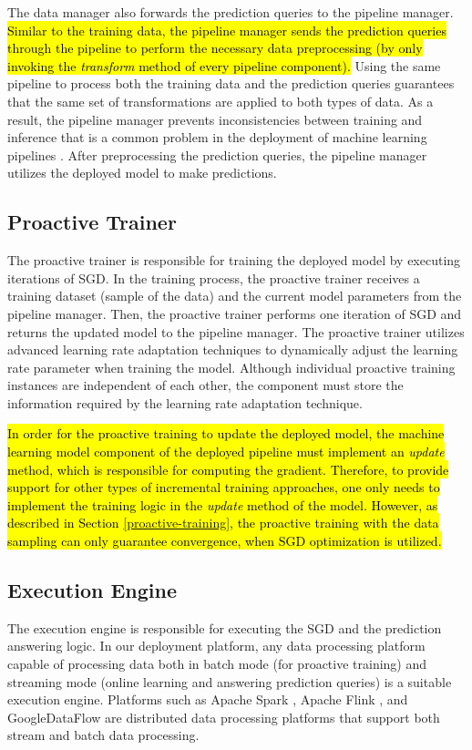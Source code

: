 The data manager also forwards the prediction queries to the pipeline manager.
\hl{Similar to the training data, the pipeline manager sends the prediction queries through the pipeline to perform the necessary data preprocessing (by only invoking the \textit{transform} method of every pipeline component).}
Using the same pipeline to process both the training data and the prediction queries guarantees that the same set of transformations are applied to both types of data.
As a result, the pipeline manager prevents inconsistencies between training and inference that is a common problem in the deployment of machine learning pipelines \cite{baylor2017tfx}.
After preprocessing the prediction queries, the pipeline manager utilizes the deployed model to make predictions.

\subsection{Proactive Trainer} 
The proactive trainer is responsible for training the deployed model by executing iterations of SGD.
In the training process, the proactive trainer receives a training dataset (sample of the data) and the current model parameters from the pipeline manager.
Then, the proactive trainer performs one iteration of SGD and returns the updated model to the pipeline manager.
The proactive trainer utilizes advanced learning rate adaptation techniques to dynamically adjust the learning rate parameter when training the model.
Although individual proactive training instances are independent of each other, the component must store the information required by the learning rate adaptation technique.

\hl{In order for the proactive training to update the deployed model, the machine learning model component of the deployed pipeline must implement an \textit{update} method, which is responsible for computing the gradient.
Therefore, to provide support for other types of incremental training approaches, one only needs to implement the training logic in the \textit{update} method of the model.
However, as described in Section \ref{proactive-training}, the proactive training with the data sampling can only guarantee convergence, when SGD optimization is utilized.}


\subsection{Execution Engine}
The execution engine is responsible for executing the SGD and the prediction answering logic.
In our deployment platform, any data processing platform capable of processing data both in batch mode (for proactive training) and streaming mode (online learning and answering prediction queries) is a suitable execution engine.
Platforms such as Apache Spark \cite{zaharia2010spark}, Apache Flink \cite{carbone2015apache}, and GoogleDataFlow \cite{akidau2015dataflow} are distributed data processing platforms that support both stream and batch data processing.